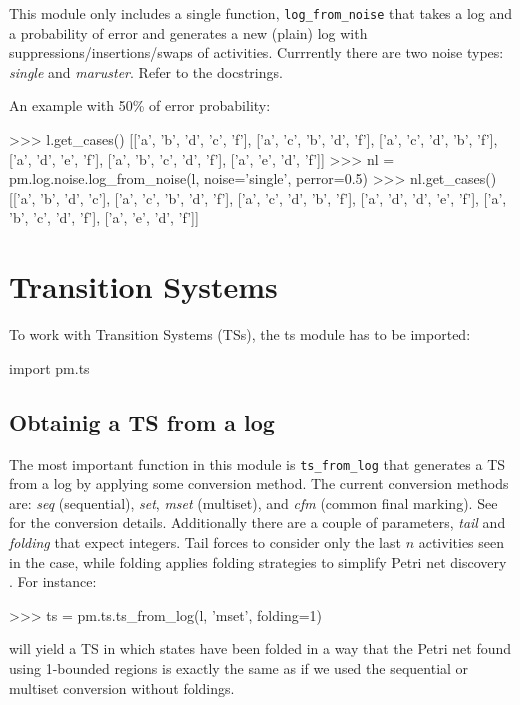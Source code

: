 \documentclass[a4paper,10pt]{book}
\begin{document}
This module only includes a single function, \texttt{log\_from\_noise} that takes a log and a probability of error and generates a new (plain) log with suppressions/insertions/swaps of activities. Currrently there are two noise types: \emph{single} and \emph{maruster}. Refer to the docstrings.

An example with 50\% of error probability: \\
\begin{pycode}
>>> l.get_cases()
[['a', 'b', 'd', 'c', 'f'],
 ['a', 'c', 'b', 'd', 'f'],
 ['a', 'c', 'd', 'b', 'f'],
 ['a', 'd', 'e', 'f'],
 ['a', 'b', 'c', 'd', 'f'],
 ['a', 'e', 'd', 'f']]
>>> nl = pm.log.noise.log_from_noise(l, noise='single', perror=0.5)
>>> nl.get_cases()
[['a', 'b', 'd', 'c'],
 ['a', 'c', 'b', 'd', 'f'],
 ['a', 'c', 'd', 'b', 'f'],
 ['a', 'd', 'd', 'e', 'f'],
 ['a', 'b', 'c', 'd', 'f'],
 ['a', 'e', 'd', 'f']]
\end{pycode}

\chapter{Transition Systems}
To work with Transition Systems (TSs), the ts module has to be imported:\\
\begin{pycode}
import pm.ts
\end{pycode}

\section{Obtainig a TS from a log}
The most important function in this module is \texttt{ts\_from\_log} that generates a TS from a log by applying some conversion method.
The current conversion methods are: \textit{seq} (sequential), \textit{set}, \textit{mset} (multiset), and \textit{cfm} (common final marking). See \cite{SoleC10} for the conversion details. Additionally there are a couple of parameters, \emph{tail} and \emph{folding} that expect integers. Tail forces to consider only the last $n$ activities seen in the case, while folding applies folding strategies to simplify Petri net discovery \cite{SoleCfoldings}. For instance:\\

\begin{pycode}
>>> ts = pm.ts.ts_from_log(l, 'mset', folding=1)
\end{pycode}

will yield a TS in which states have been folded in a way that the Petri net found using 1-bounded regions is exactly the same as if we used the sequential or multiset conversion without foldings.
\end{document}

